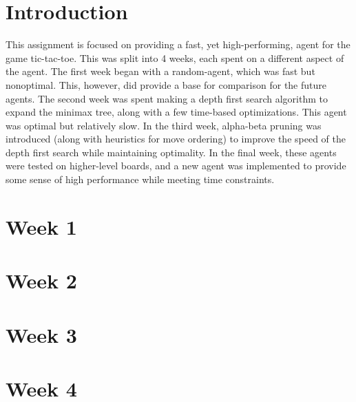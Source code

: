 \documentclass[12pt]{article}
\begin{document}
\setcounter{section}{-1}
\section{Introduction}
This assignment is focused on providing a fast, yet high-performing, agent for the game tic-tac-toe. This was split into 4 weeks, each spent on a different aspect of the agent. The first week began with a random-agent, which was fast but nonoptimal. This, however, did provide a base for comparison for the future agents. The second week was spent making a depth first search algorithm to expand the minimax tree, along with a few time-based optimizations. This agent was optimal but relatively slow. In the third week, alpha-beta pruning was introduced (along with heuristics for move ordering) to improve the speed of the depth first search while maintaining optimality. In the final week, these agents were tested on higher-level boards, and a new agent was implemented to provide some sense of high performance while meeting time constraints.

\section{Week 1}


\section{Week 2}


\section{Week 3}


\section{Week 4}

\end{document}
